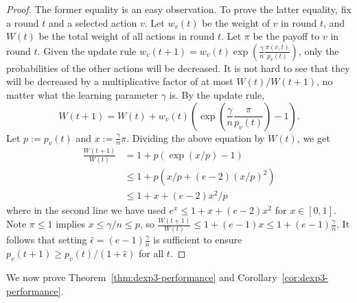 \documentclass{sig-alternate-dan}
\numberwithin{equation}{section}
\newcommand{\numsensors}{\ensuremath{n}}
\newcommand{\sensor}{\ensuremath{v}}
\newcommand{\payoff}{\ensuremath{\pi}}
\newcommand{\paren} [1] {\ensuremath{ \left( {#1} \right) }}
\begin{document}
{\begin{proof}
The former equality is an easy observation.
To prove the latter equality, fix a round $t$ and a selected action
$\sensor$.  Let 
$w_{\sensor}(t)$ be the weight of $\sensor$ in round $t$, and $W(t)$ be the
total weight of all actions in round $t$.
Let $\payoff$ be the payoff to $\sensor$ in round $t$.
Given the update rule 
$w_{\sensor}(t+1) =
w_{\sensor}(t)\exp\paren{\frac{\gamma}{\numsensors}\frac{\payoff(\sensor,t)}{p_{\sensor}(t)}}$,
only the probabilities of the other actions will be decreased.
It is not hard to see that they will be decreased by a multiplicative factor of at most 
$W(t)/W(t+1)$, no matter what the learning parameter $\gamma$ is.
By the update rule, 
\[
W(t+1) = W(t) +
w_{\sensor}(t)\paren{\exp\paren{\frac{\gamma}{\numsensors}
\frac{\payoff}{p_{\sensor}(t)}}
    - 1}\mbox{.}
\]
Let $p := p_{\sensor}(t)$ and $x :=
\frac{\gamma}{\numsensors}\payoff$.  
Dividing the above equation by $W(t)$, we get 
%
\begin{align}
\frac{W(t+1)}{W(t)} & = 1 + p\paren{\exp\paren{x/p} - 1} \\
 & \le 1 + p\paren{x/p + (e-2)(x/p)^2}\\
 & \le 1 + x + (e-2)x^2/p
\end{align}
%
where in the second line we have used 
$e^x \le 1 + x + (e-2)x^2$ for $x \in [0,1]$.
Note $\payoff \le 1$ implies $x \le \gamma/n \le p$, so 
$\frac{W(t+1)}{W(t)} \le 1 + (e-1)x \le 1 +
(e-1)\frac{\gamma}{\numsensors}$.
It follows that setting $\hat{\epsilon} =
(e-1)\frac{\gamma}{\numsensors}$ is sufficient to ensure 
$p_{\sensor}(t+1) \ge p_{\sensor}(t)/(1+\hat{\epsilon})$ for all $t$.
\end{proof}

We now prove Theorem~\ref{thm:dexp3-performance} and Corollary~\ref{cor:dexp3-performance}.

}
\end{document}
